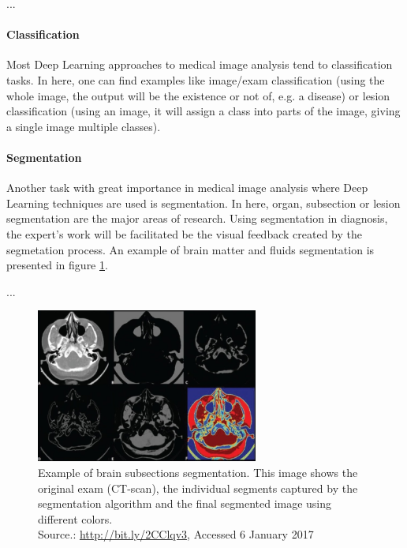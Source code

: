 \documentclass[
  twoside,
  11pt, a4paper,
  footinclude=true,
  headinclude=true,
  cleardoublepage=empty
]{scrbook}
\begin{document}
      ...

      \paragraph{Classification}
        Most Deep Learning approaches to medical image analysis tend to classification tasks. In here, one can find examples like image/exam classification (using the whole image, the output will be the existence or not of, e.g. a disease) or lesion classification (using an image, it will assign a class into parts of the image, giving a single image multiple classes).

      \paragraph{Segmentation}
        Another task with great importance in medical image analysis where Deep Learning techniques are used is segmentation. In here, organ, subsection or lesion segmentation are the major areas of research. Using segmentation in diagnosis, the expert's work will be facilitated be the visual feedback created by the segmetation process. An example of brain matter and fluids segmentation is presented in figure \ref{background:medical-image:segmentation}.

        ...

        \begin{figure}[t]
          \centering
          \includegraphics[width=0.65\textwidth]{"./img/img-classification-segmentation"}
          \caption[Example of brain subsections segmentation]{Example of brain subsections segmentation. This image shows the original exam (CT-scan), the individual segments captured by the segmentation algorithm and the final segmented image using different colors.
          \\Source.: \href{http://bit.ly/2CClqv3}{http://bit.ly/2CClqv3}, Accessed 6 January 2017}
          \label{background:medical-image:segmentation}
        \end{figure}
\end{document}
